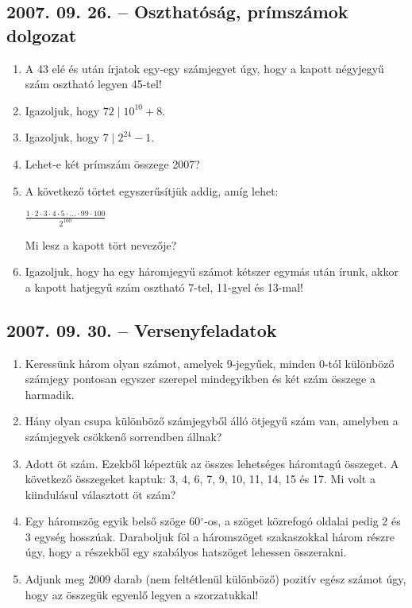 \documentclass{article}
\newcommand{\degre}{\ensuremath{^\circ}}
\begin{document}
\subsection*{2007. 09. 26. -- Oszthatóság, prímszámok dolgozat}
\begin{enumerate}
\item A 43 elé és után írjatok egy-egy számjegyet úgy, hogy a kapott négyjegyű szám osztható legyen 45-tel!
\item Igazoljuk, hogy $72 \mid 10^{10}+8$.
\item Igazoljuk, hogy $7 \mid 2^{24}-1$.
\item Lehet-e két prímszám összege 2007?
\item A következő törtet egyszerűsítjük addig, amíg lehet:

\begin{center}
$\displaystyle{\frac{1\cdot2\cdot3\cdot4\cdot5\cdot\ldots\cdot99\cdot100}{2^{100}}}$
\end{center}

Mi lesz a kapott tört nevezője?
\item Igazoljuk, hogy ha egy háromjegyű számot kétszer egymás után írunk, akkor a kapott hatjegyű szám osztható 7-tel, 11-gyel és 13-mal!
\end{enumerate}


\subsection*{2007. 09. 30. -- Versenyfeladatok}
\begin{enumerate}
\item Keressünk három olyan számot, amelyek 9-jegyűek, minden 0-tól különböző számjegy pontosan egyszer szerepel mindegyikben és két szám összege a harmadik.
\item Hány olyan csupa különböző számjegyből álló ötjegyű szám van, amelyben a számjegyek csökkenő sorrendben állnak?
\item Adott öt szám. Ezekből képeztük az összes lehetséges háromtagú összeget. A következő összegeket kaptuk: 3, 4, 6, 7, 9, 10, 11, 14, 15 és 17. Mi volt a kiindulásul választott öt szám?
\item Egy háromszög egyik belső szöge $60\degre$-os, a szöget közrefogó oldalai pedig 2 és 3 egység hosszúak. Daraboljuk föl a háromszöget szakaszokkal három részre úgy, hogy a részekből egy szabályos hatszöget lehessen összerakni.
\item Adjunk meg 2009 darab (nem feltétlenül különböző) pozitív egész számot úgy, hogy az összegük egyenlő legyen a szorzatukkal!
\end{enumerate}
\end{document}
